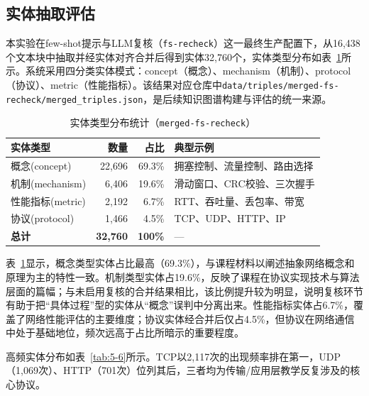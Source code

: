 \subsection{实体抽取评估}

本实验在few-shot提示与LLM复核（\texttt{fs-recheck}）这一最终生产配置下，从16,438个文本块中抽取并经实体对齐合并后得到实体32,760个，实体类型分布如表~\ref{tab:5-5}所示。系统采用四分类实体模式：concept（概念）、mechanism（机制）、protocol（协议）、metric（性能指标）。该结果对应仓库中\texttt{data/triples/merged-fs-recheck/merged\_triples.json}，是后续知识图谱构建与评估的统一来源。

\begin{table}[ht]
    \centering
    \caption{实体类型分布统计（\texttt{merged-fs-recheck}）}
    \label{tab:5-5}
    \begin{tabular}{lrrl}
    \toprule
    \textbf{实体类型} & \textbf{数量} & \textbf{占比} & \textbf{典型示例} \\
    \midrule
    概念(concept) & 22,696 & 69.3\% & 拥塞控制、流量控制、路由选择 \\
    机制(mechanism) & 6,406 & 19.6\% & 滑动窗口、CRC校验、三次握手 \\
    性能指标(metric) & 2,192 & 6.7\% & RTT、吞吐量、丢包率、带宽 \\
    协议(protocol) & 1,466 & 4.5\% & TCP、UDP、HTTP、IP \\
    \midrule
    \textbf{总计} & \textbf{32,760} & \textbf{100\%} & — \\
    \bottomrule
    \end{tabular}
\end{table}

表~\ref{tab:5-5}显示，概念类型实体占比最高（69.3\%），与课程材料以阐述抽象网络概念和原理为主的特性一致。机制类型实体占19.6\%，反映了课程在协议实现技术与算法层面的篇幅；与未启用复核的合并结果相比，该比例提升较为明显，说明复核环节有助于把“具体过程”型的实体从“概念”误判中分离出来。性能指标实体占6.7\%，覆盖了网络性能评估的主要维度；协议实体经合并后仅占4.5\%，但协议在网络通信中处于基础地位，频次远高于占比所暗示的重要程度。

高频实体分布如表~\ref{tab:5-6}所示。TCP以2,117次的出现频率排在第一，UDP（1,069次）、HTTP（701次）位列其后，三者均为传输/应用层教学反复涉及的核心协议。

